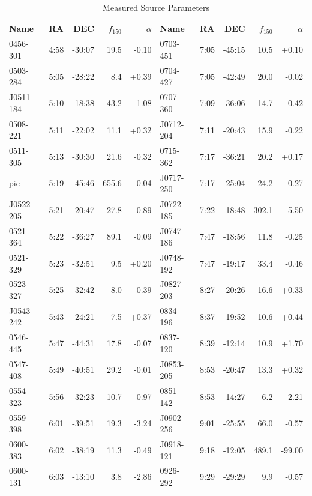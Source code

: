 \documentclass[preprint]{aastex}
\begin{document}
\begin{table}[ht]
\caption{Measured Source Parameters}
\begin{tabular}{l|lrrr||l|lrrr}
\hline
Name & RA & DEC & $f_{150}$ & $\alpha$ & Name & RA & DEC & $f_{150}$ & $\alpha$
\\
\hline
  0456-301 &  4:58 & -30:07 &   19.5 & -0.10 &   0703-451 &  7:05 & -45:15 &   10.5 & +0.10 \\
  0503-284 &  5:05 & -28:22 &    8.4 & +0.39 &   0704-427 &  7:05 & -42:49 &   20.0 & -0.02 \\
 J0511-184 &  5:10 & -18:38 &   43.2 & -1.08 &   0707-360 &  7:09 & -36:06 &   14.7 & -0.42 \\
  0508-221 &  5:11 & -22:02 &   11.1 & +0.32 &  J0712-204 &  7:11 & -20:43 &   15.9 & -0.22 \\
  0511-305 &  5:13 & -30:30 &   21.6 & -0.32 &   0715-362 &  7:17 & -36:21 &   20.2 & +0.17 \\
       pic &  5:19 & -45:46 &  655.6 & -0.04 &  J0717-250 &  7:17 & -25:04 &   24.2 & -0.27 \\
 J0522-205 &  5:21 & -20:47 &   27.8 & -0.89 &  J0722-185 &  7:22 & -18:48 &  302.1 & -5.50 \\
  0521-364 &  5:22 & -36:27 &   89.1 & -0.09 &  J0747-186 &  7:47 & -18:56 &   11.8 & -0.25 \\
  0521-329 &  5:23 & -32:51 &    9.5 & +0.20 &  J0748-192 &  7:47 & -19:17 &   33.4 & -0.46 \\
  0523-327 &  5:25 & -32:42 &    8.0 & -0.39 &  J0827-203 &  8:27 & -20:26 &   16.6 & +0.33 \\
 J0543-242 &  5:43 & -24:21 &    7.5 & +0.37 &   0834-196 &  8:37 & -19:52 &   10.6 & +0.44 \\
  0546-445 &  5:47 & -44:31 &   17.8 & -0.07 &   0837-120 &  8:39 & -12:14 &   10.9 & +1.70 \\
  0547-408 &  5:49 & -40:51 &   29.2 & -0.01 &  J0853-205 &  8:53 & -20:47 &   13.3 & +0.32 \\
  0554-323 &  5:56 & -32:23 &   10.7 & -0.97 &   0851-142 &  8:53 & -14:27 &    6.2 & -2.21 \\
  0559-398 &  6:01 & -39:51 &   19.3 & -3.24 &  J0902-256 &  9:01 & -25:55 &   66.0 & -0.57 \\
  0600-383 &  6:02 & -38:19 &   11.3 & -0.49 &  J0918-121 &  9:18 & -12:05 &  489.1 & -99.00 \\
  0600-131 &  6:03 & -13:10 &    3.8 & -2.86 &   0926-292 &  9:29 & -29:29 &    9.9 & -0.57 \\

\end{tabular}
\end{table}
\end{document}
